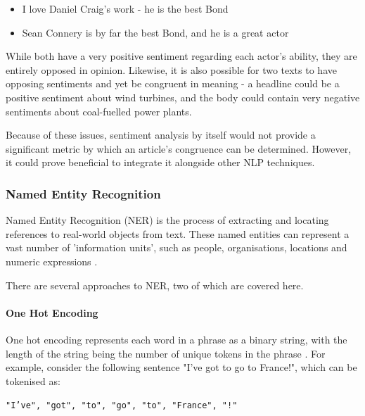 \begin{itemize}
	\item I love Daniel Craig's work - he is the best Bond
	\item Sean Connery is by far the best Bond, and he is a great actor
\end{itemize}

While both have a very positive sentiment regarding each actor's ability, they are entirely opposed in opinion. Likewise, it is also possible for two texts to have opposing sentiments and yet be congruent in meaning - a headline could be a positive sentiment about wind turbines, and the body could contain very negative sentiments about coal-fuelled power plants.

Because of these issues, sentiment analysis by itself would not provide a significant metric by which an article's congruence can be determined. However, it could prove beneficial to integrate it alongside other NLP techniques. 

\subsubsection{Named Entity Recognition}
Named Entity Recognition (NER) is the process of extracting and locating references to real-world objects from text. These named entities can represent a vast number of 'information units', such as people, organisations, locations and numeric expressions \cite{nadeau2007}. 

There are several approaches to NER, two of which are covered here.

\paragraph{One Hot Encoding}
One hot encoding represents each word in a phrase as a binary string, with the length of the string being the number of unique tokens in the phrase \cite{bommana2019}.  For example, consider the following sentence "I've got to go to France!", which can be tokenised as:
\begin{center}\texttt{"I've", "got", "to", "go", "to", "France", "!"}
\end{center}

